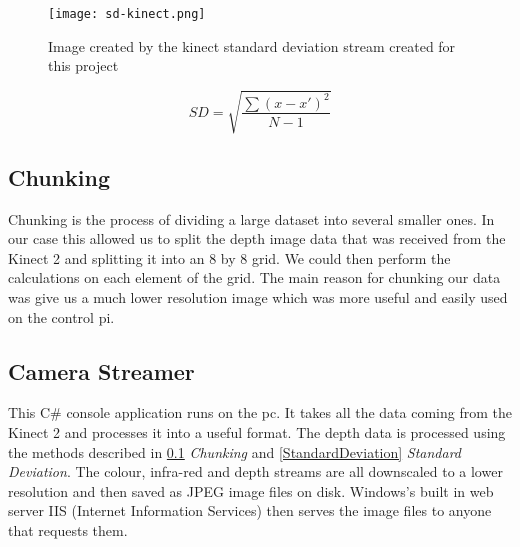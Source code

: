 \begin{figure}[!htb]
\begin{center}
\texttt{[image: sd-kinect.png]}
\end{center}
\caption{Image created by the kinect standard deviation stream created for this project}
\label{fig:sd-kinect}
\end{figure}

\begin{capequ}[!htb]
\begin{center}
\begin{equation}
\textit{SD} = \sqrt{\frac{\sum (x - x')^2}{N - 1}}
\end{equation}
\caption{Standard Deviation Equation}
\label{SDEquation}
\end{center}
\end{capequ}

\subsection{Chunking}\label{Chunking}
Chunking is the process of dividing a large dataset into several smaller ones. In our case this allowed us to split the depth image data that was received from the Kinect 2 and splitting it into an 8 by 8 grid. We could then perform the calculations on each element of the grid. The main reason for chunking our data was give us a much lower resolution image which was more useful and easily used on the control pi.

\subsection{Camera Streamer}
This C\# console application runs on the pc. It takes all the data coming from the Kinect 2 and processes it into a useful format.
The depth data is processed using the methods described in \ref{Chunking} \textit{Chunking} and \ref{StandardDeviation} \textit{Standard Deviation}. The colour, infra-red and depth streams are all downscaled to a lower resolution and then saved as JPEG image files on disk. Windows's built in web server IIS (Internet Information Services) then serves the image files to anyone that requests them.

\pagestyle{euanstuart}













